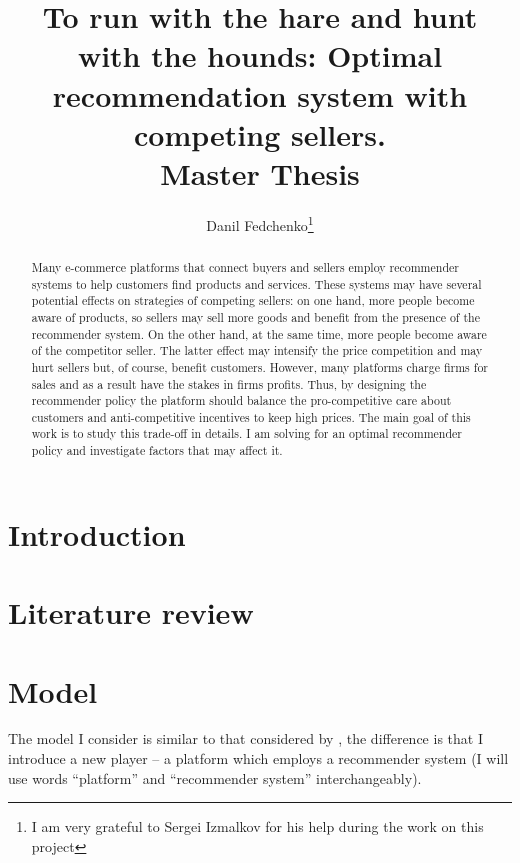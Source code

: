\documentclass[a4paper]{article}
\title{To run with the hare and hunt with the hounds: Optimal recommendation system with competing sellers. \\ Master Thesis}
\date{}
\author{Danil Fedchenko\thanks{I am very grateful to Sergei Izmalkov for his help during the work on this project}}
\begin{document}
	\maketitle
	\begin{abstract}
		Many e-commerce platforms that connect buyers and sellers employ recommender systems to help customers find products and services. These systems may have several potential effects on strategies of competing sellers: on one hand, more people become aware of products, so sellers may sell more goods and benefit from the presence of the recommender system. On the other hand, at the same time, more people become aware of the competitor seller. The latter effect may intensify the price competition and may hurt sellers but, of course, benefit customers. However, many platforms charge firms for sales and as a result have the stakes in firms profits. Thus, by designing the recommender policy the platform should balance the pro-competitive care about customers and anti-competitive incentives to keep high prices. The main goal of this work is to study this trade-off in details. I am solving for an optimal recommender policy and investigate factors that may affect it.
	\end{abstract}
\newpage
\tableofcontents
\newpage
	\section{Introduction}
	\section{Literature review}
	\section{Model}
	The model I consider is similar to that considered by \cite{levin2009quality}, the difference is that I introduce a new player -- a platform which employs a recommender system (I will use words ``platform'' and ``recommender system'' interchangeably).
		
\end{document}
